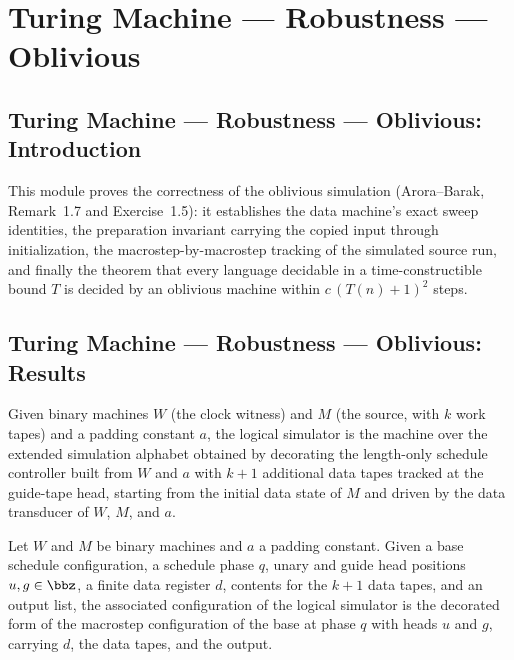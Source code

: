 \section{Turing Machine --- Robustness --- Oblivious}
\subsection*{Turing Machine --- Robustness --- Oblivious: Introduction}

This module proves the correctness of the oblivious simulation (Arora--Barak,
Remark~1.7 and Exercise~1.5): it establishes the data machine's exact sweep
identities, the preparation invariant carrying the copied input through
initialization, the macrostep-by-macrostep tracking of the simulated source
run, and finally the theorem that every language decidable in a
time-constructible bound $T$ is decided by an oblivious machine within
$c\,(T(n)+1)^2$ steps.

\subsection*{Turing Machine --- Robustness --- Oblivious: Results}

\begin{definition}
\label{Complexity.dataTM}
\leanok
{}
Given binary machines $W$ (the clock witness) and $M$ (the source, with $k$ work
tapes) and a padding constant $a$, the logical simulator is the machine over the
extended simulation alphabet obtained by decorating the length-only schedule
controller built from $W$ and $a$ with $k+1$ additional data tapes tracked at the
guide-tape head, starting from the initial data state of $M$ and driven by the
data transducer of $W$, $M$, and $a$.
\end{definition}

\begin{definition}
\label{Complexity.dataCfg}
\leanok
{}
Let $W$ and $M$ be binary machines and $a$ a padding constant.  Given a base
schedule configuration, a schedule phase $q$, unary and guide head positions
$u, g \in \bbz$, a finite data register $d$, contents for the $k+1$ data tapes,
and an output list, the associated configuration of the logical simulator is the
decorated form of the macrostep configuration of the base at phase $q$ with
heads $u$ and $g$, carrying $d$, the data tapes, and the output.
\end{definition}

